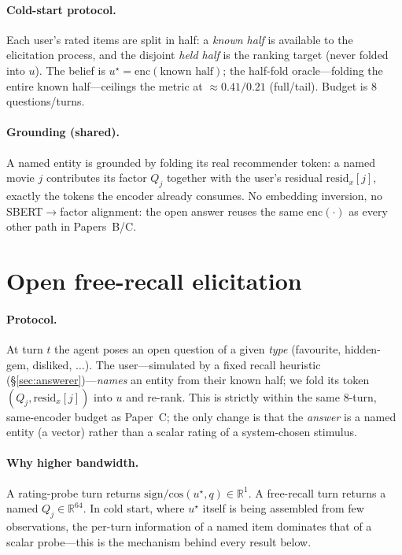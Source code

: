 \documentclass[11pt]{article}
\newcommand{\R}{\mathbb{R}}
\begin{document}
\paragraph{Cold-start protocol.} Each user's rated items are split in half: a \emph{known half} is available to the
elicitation process, and the disjoint \emph{held half} is the ranking target (never folded into $u$). The belief is
$u^\star = \mathrm{enc}(\text{known half})$; the half-fold oracle---folding the entire known half---ceilings the metric
at $\approx 0.41/0.21$ (full/tail). Budget is $8$ questions/turns.

\paragraph{Grounding (shared).} A named entity is grounded by folding its real recommender token: a named movie $j$
contributes its factor $Q_j$ together with the user's residual $\mathrm{resid}_x[j]$, exactly the tokens the encoder
already consumes. No embedding inversion, no SBERT$\to$factor alignment: the open answer reuses the same
$\mathrm{enc}(\cdot)$ as every other path in Papers~B/C.

\section{Open free-recall elicitation}
\label{sec:method}
\paragraph{Protocol.} At turn $t$ the agent poses an open question of a given \emph{type} (favourite, hidden-gem,
disliked, $\dots$). The user---simulated by a fixed recall heuristic (\S\ref{sec:answerer})---\emph{names} an entity
from their known half; we fold its token $(Q_j,\mathrm{resid}_x[j])$ into $u$ and re-rank. This is strictly within the
same $8$-turn, same-encoder budget as Paper~C; the only change is that the \emph{answer} is a named entity (a vector)
rather than a scalar rating of a system-chosen stimulus.

\paragraph{Why higher bandwidth.} A rating-probe turn returns $\mathrm{sign}/\mathrm{cos}(u^\star,q)\in\R^1$. A
free-recall turn returns a named $Q_j\in\R^{64}$. In cold start, where $u^\star$ itself is being assembled from few
observations, the per-turn information of a named item dominates that of a scalar probe---this is the mechanism behind
every result below.
\end{document}
